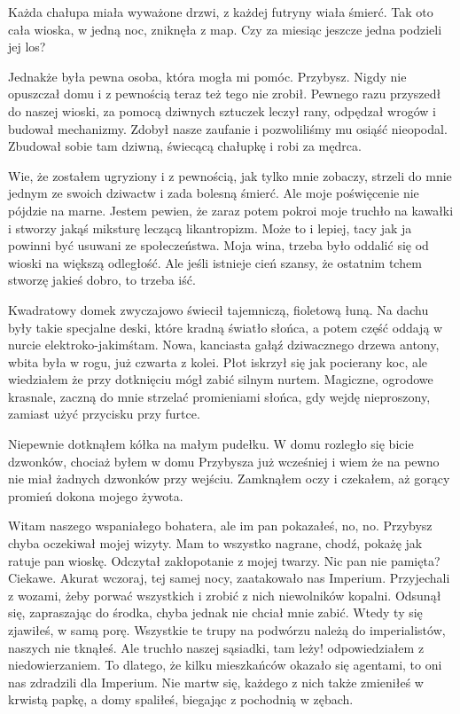 Każda chałupa miała wyważone drzwi, z każdej futryny wiała śmierć.
Tak oto cała wioska, w jedną noc, zniknęła z map.
Czy za miesiąc jeszcze jedna podzieli jej los? 

Jednakże była pewna osoba, która mogła mi pomóc.
Przybysz. Nigdy nie opuszczał domu i z pewnością teraz też tego nie zrobił.
Pewnego razu przyszedł do naszej wioski, za pomocą dziwnych sztuczek leczył rany, odpędzał wrogów i budował mechanizmy.
Zdobył nasze zaufanie i pozwoliliśmy mu osiąść nieopodal. Zbudował sobie tam dziwną, świecącą chałupkę i robi za mędrca.

Wie, że zostałem ugryziony i z pewnością, jak tylko mnie zobaczy, strzeli do mnie jednym ze swoich dziwactw i zada bolesną śmierć.
Ale moje poświęcenie nie pójdzie na marne. Jestem pewien, że zaraz potem pokroi moje truchło na kawałki i stworzy jakąś miksturę leczącą likantropizm.
Może to i lepiej, tacy jak ja powinni być usuwani ze społeczeństwa. Moja wina, trzeba było oddalić się od wioski na większą odległość.
Ale jeśli istnieje cień szansy, że ostatnim tchem stworzę jakieś dobro, to trzeba iść.

\divider{}

Kwadratowy domek zwyczajowo świecił tajemniczą, fioletową łuną.
Na dachu były takie specjalne deski, które kradną światło słońca, a potem część oddają w nurcie elektroko-jakimśtam.
Nowa, kanciasta gałąź dziwacznego drzewa antony, wbita była w rogu, już czwarta z kolei.
Płot iskrzył się jak pocierany koc, ale wiedziałem że przy dotknięciu mógł zabić silnym nurtem.
Magiczne, ogrodowe krasnale, zaczną do mnie strzelać promieniami słońca, gdy wejdę nieproszony, zamiast użyć przycisku przy furtce.

Niepewnie dotknąłem kółka na małym pudełku. 
W domu rozległo się bicie dzwonków, chociaż byłem w domu Przybysza już wcześniej i wiem że na pewno nie miał żadnych dzwonków przy wejściu.
Zamknąłem oczy i czekałem, aż gorący promień dokona mojego żywota.

\begin{dialogue}
\ds{} Witam naszego wspaniałego bohatera, ale im pan pokazałeś, no, no. 
\dm{} Przybysz chyba oczekiwał mojej wizyty. \dm{} Mam to wszystko nagrane, chodź, pokażę jak ratuje pan wioskę.
\dm{} Odczytał zakłopotanie z mojej twarzy.
\dm{} Nic pan nie pamięta? Ciekawe. Akurat wczoraj, tej samej nocy, zaatakowało nas Imperium.
Przyjechali z wozami, żeby porwać wszystkich i zrobić z nich niewolników kopalni.
\dm{} Odsunął się, zapraszając do środka, chyba jednak nie chciał mnie zabić.
\dm{} Wtedy ty się zjawiłeś, w samą porę. Wszystkie te trupy na podwórzu należą do imperialistów, naszych nie tknąłeś.
\ds{} Ale truchło naszej sąsiadki, tam leży! \dm{} odpowiedziałem z niedowierzaniem.
\ds{} To dlatego, że kilku mieszkańców okazało się agentami, to oni nas zdradzili dla Imperium. 
Nie martw się, każdego z nich także zmieniłeś w krwistą papkę, a domy spaliłeś, biegając z pochodnią w zębach.
\end{dialogue}

